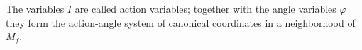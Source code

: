 The variables $I$ are called action variables; together with the angle variables $\varphi$ they form the action-angle system of canonical coordinates in a neighborhood of $M_f$.
